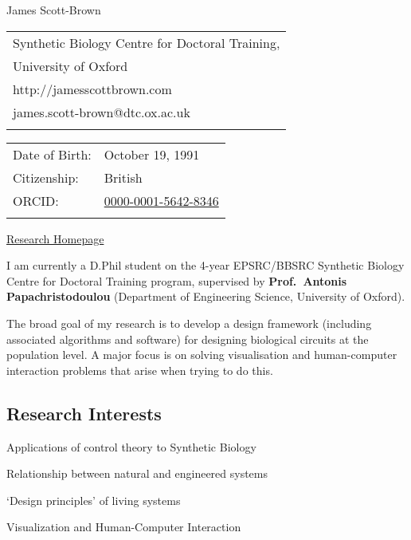 \documentclass[letterpaper]{article}
\def\name{James Scott-Brown}
\renewenvironment{itemize}{
  \begin{compactitem}{}{
    \setlength{\leftmargin}{1.5em}
  }
}{
  \end{compactitem}
}
\begin{document}
{\huge \name}


\vspace{0.25in}
\begin{minipage}[t]{0.5\textwidth}
\begin{tabular}{l}  	
Synthetic Biology Centre for Doctoral Training,\\
University of Oxford\\
http://jamesscottbrown.com\\
james.scott-brown@dtc.ox.ac.uk \\ \\
\end{tabular}
\end{minipage}
\begin{minipage}[t]{0.5\textwidth}
\begin{tabular}{ll}  	
Date of Birth: &October 19, 1991 \\
Citizenship: &British \\
ORCID: &\href{https://orcid.org/0000-0001-5642-8346}{0000-0001-5642-8346} \\ \\
\end{tabular}
\end{minipage}

\href{http://sysos.eng.ox.ac.uk/tebio/}{Research Homepage}

I am currently a D.Phil student on the 4-year EPSRC/BBSRC Synthetic
Biology Centre for Doctoral Training program, supervised by
\textbf{Prof.~Antonis Papachristodoulou} (Department of Engineering
Science, University of Oxford).

The broad goal of my research is to develop a design framework
(including associated algorithms and software) for designing biological
circuits at the population level. A major focus is on solving
visualisation and human-computer interaction problems that arise when
trying to do this.

\subsection{Research Interests}\label{research-interests}

\begin{itemize}
\tightlist
\item
  Applications of control theory to Synthetic Biology
\item
  Relationship between natural and engineered systems
\item
  `Design principles' of living systems
\item
  Visualization and Human-Computer Interaction
\end{itemize}
\end{document}

